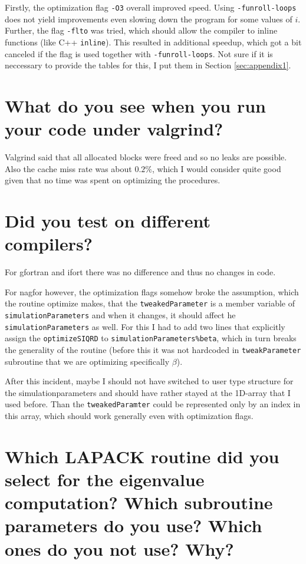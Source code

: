 \documentclass[a4paper]{article}
\begin{document}
Firstly, the optimization flag \texttt{-O3} overall improved speed. Using \texttt{-funroll-loops} does not yield improvements even slowing down the program for some values of $ i $. Further, the flag \texttt{-flto} was tried, which should allow the compiler to inline functions (like C++ \texttt{inline}). This resulted in additional speedup, which got a bit canceled if the flag is used together with \texttt{-funroll-loops}. Not sure if it is neccessary to provide the tables for this, I put them in Section \ref{sec:appendix1}.

\section{What do you see when you run your code under valgrind?}
Valgrind said that all allocated blocks were freed and so no leaks are possible. Also the cache miss rate was about $ 0.2\% $, which I would consider quite good given that no time was spent on optimizing the procedures.

\section{Did you test on different compilers?}
For gfortran and ifort there was no difference and thus no changes in code. 

For nagfor however, the optimization flags somehow broke the assumption, which the routine optimize makes, that the \texttt{tweakedParameter} is a member variable of \texttt{simulationParameters} and when it changes, it should affect he \texttt{simulationParameters} as well. For this I had to add two lines that explicitly assign the \texttt{optimizeSIQRD} to \texttt{simulationParameters\%beta}, which in turn breaks the generality of the routine (before this it was not hardcoded in \texttt{tweakParameter} subroutine that we are optimizing specifically $ \beta $).

After this incident, maybe I should not have switched to user type structure for the simulationparameters and should have rather stayed at the 1D-array that I used before. Than the \texttt{tweakedParamter} could be represented only by an index in this array, which should work generally even with optimization flags.

\section{Which LAPACK routine did you select for the eigenvalue computation? Which subroutine parameters do you use? Which ones do you not use? Why?}
\end{document}
